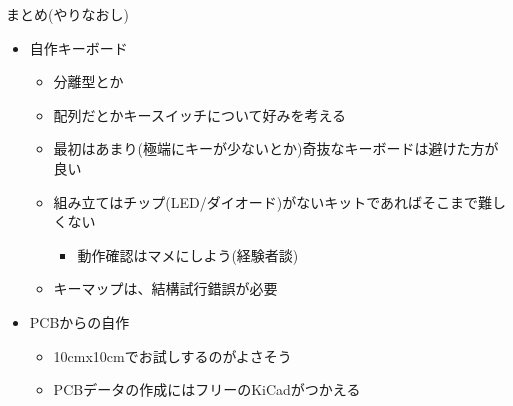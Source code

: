\documentclass[cjk,dvipdfmx,10pt,compress,fragile%
hyperref={bookmarks=true,bookmarksnumbered=true,bookmarksopen=false,%
colorlinks=false,%
pdftitle={第 134 回 関西 Debian 勉強会},%
pdfauthor={小林},%
pdfsubject={資料},%
}]{beamer}
\begin{document}
\begin{frame}[fragile,t]{まとめ(やりなおし)}
 \begin{itemize}
  \item 自作キーボード
	\begin{itemize}
	 \item 分離型とか
	 \item 配列だとかキースイッチについて好みを考える
	 \item 最初はあまり(極端にキーが少ないとか)奇抜なキーボードは避けた方が良い
	 \item 組み立てはチップ(LED/ダイオード)がないキットであればそこまで難しくない
	       \begin{itemize}
		\item 動作確認はマメにしよう(経験者談)
	       \end{itemize}
	 \item キーマップは、結構試行錯誤が必要
	\end{itemize}
  \item PCBからの自作
	\begin{itemize}
	 \item 10cmx10cmでお試しするのがよさそう
	 \item PCBデータの作成にはフリーのKiCadがつかえる
	\end{itemize}
 \end{itemize}
\end{frame}
\end{document}
